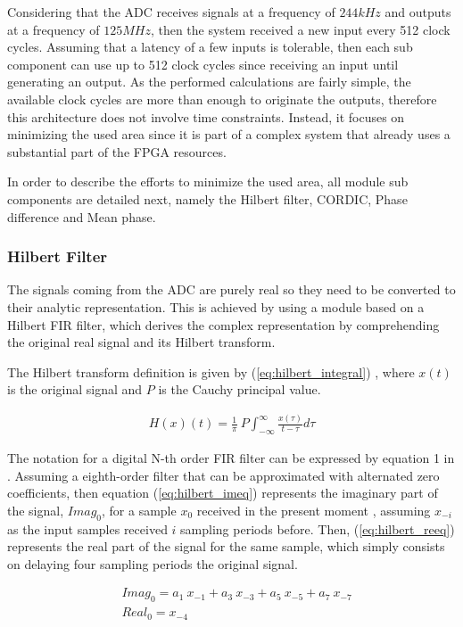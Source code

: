 Considering that the ADC receives signals at a frequency of $244 kHz$ and outputs at a frequency of $125MHz$, then the system received a new input every 512 clock cycles. Assuming that a latency of a few inputs is tolerable, then each sub component can use up to 512 clock cycles since receiving an input until generating an output. As the performed calculations are fairly simple, the available clock cycles are more than enough to originate the outputs, therefore this architecture does not involve time constraints. Instead, it focuses on minimizing the used area since it is part of a complex system that already uses a substantial part of the FPGA resources.

In order to describe the efforts to minimize the used area, all module sub components are detailed next, namely the Hilbert filter, CORDIC, Phase difference and Mean phase.

\subsubsection{Hilbert Filter}

The signals coming from the ADC are purely real so they need to be converted to their analytic representation. This is achieved by using a module based on a Hilbert FIR filter, which derives the complex representation by comprehending the original real signal and its Hilbert transform. 

The Hilbert transform definition is given by (\ref{eq:hilbert_integral}) \cite{hilbert-def}, where $x(t)$ is the original signal and $P$ is the Cauchy principal value.

\begin{eqnarray}
	H(x)(t) = \frac{1}{\pi} \ P \int_{-\infty}^{\infty}\frac{x(\tau)}{t-\tau}d\tau
	\label{eq:hilbert_integral}
\end{eqnarray}

The notation for a digital N-th order FIR filter can be expressed by equation 1 in \cite{hilbert-fpga}. Assuming a eighth-order filter that can be approximated with alternated zero coefficients, then equation (\ref{eq:hilbert_imeq}) represents the imaginary part of the signal, $Imag_0$, for a sample $x_{0}$ received in the present moment , assuming $x_{-i}$ as the input samples received $i$ sampling periods before. Then, (\ref{eq:hilbert_reeq}) represents the real part of the signal for the same sample, which simply consists on delaying four sampling periods the original signal.

\begin{eqnarray}
	&Imag_0 = a_{1} \ x_{-1} +a_{3} \ x_{-3} + a_{5} \ x_{-5} + a_{7} \ x_{-7} \\
	\label{eq:hilbert_imeq}
	&Real_0 = x_{-4} 
	\label{eq:hilbert_reeq}
\end{eqnarray}


